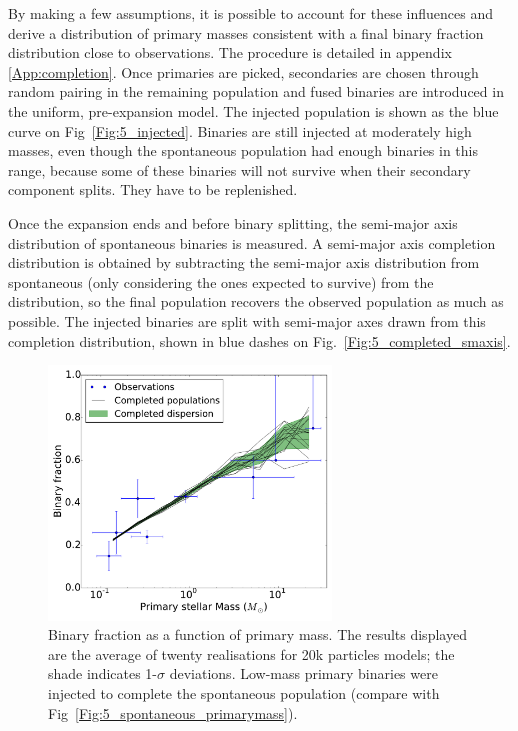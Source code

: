 By making a few assumptions, it is possible to account for these influences and derive a distribution of primary masses consistent with a final binary fraction distribution close to observations. The procedure is detailed in appendix \ref{App:completion}. Once primaries are picked, secondaries are chosen through random pairing in the remaining population and fused binaries are introduced in the uniform, pre-expansion model. The injected population is shown as the blue curve on Fig~\ref{Fig:5_injected}. Binaries are still injected at moderately high masses, even though the spontaneous population had enough binaries in this range, because some of these binaries will not survive when their secondary component splits. They have to be replenished.



Once the expansion ends and before binary splitting, the semi-major axis distribution of spontaneous binaries is measured. A semi-major axis completion distribution is obtained by subtracting the semi-major axis distribution from spontaneous (only considering the ones expected to survive) from the \cite{Raghavan2010} distribution, so the final population recovers the observed population as much as possible. The injected binaries are split with semi-major axes drawn from this completion distribution, shown in blue dashes on Fig.~\ref{Fig:5_completed_smaxis}. 




\begin{figure}
\begin{center}
\includegraphics[width=0.67\textwidth]{Figures/5_completed_primarymass}
\caption[Completed binary population: fraction vs primary mass]{Binary fraction as a function of primary mass. The results displayed are the average of twenty realisations for 20k particles models; the shade indicates 1-$\sigma$ deviations. Low-mass primary binaries were injected to complete the spontaneous population (compare with Fig~\protect\ref{Fig:5_spontaneous_primarymass}).}
\label{Fig:5_completed_primarymass}
\end{center}
\end{figure}

